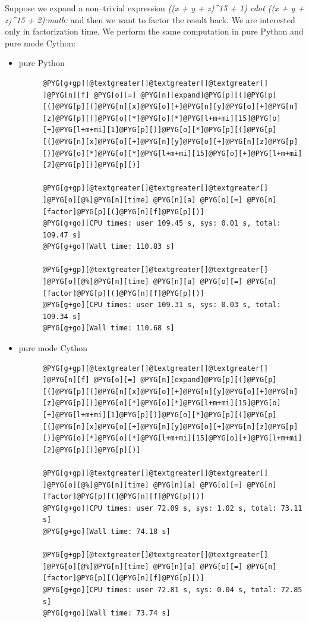 Suppose we expand a non--trivial expression \emph{((x + y + z)\textasciicircum{}15 + 1) cdot ((x + y + z)\textasciicircum{}15 + 2):math:} and
then we want to factor the result back. We are interested only in factorization time. We perform
the same computation in pure Python and pure mode Cython:
\begin{itemize}
\item {} \begin{description}
\item[pure Python] \leavevmode
\begin{Verbatim}[commandchars=@\[\]]
@PYG[g+gp][@textgreater[]@textgreater[]@textgreater[] ]@PYG[n][f] @PYG[o][=] @PYG[n][expand]@PYG[p][(]@PYG[p][(]@PYG[p][(]@PYG[n][x]@PYG[o][+]@PYG[n][y]@PYG[o][+]@PYG[n][z]@PYG[p][)]@PYG[o][*]@PYG[o][*]@PYG[l+m+mi][15]@PYG[o][+]@PYG[l+m+mi][1]@PYG[p][)]@PYG[o][*]@PYG[p][(]@PYG[p][(]@PYG[n][x]@PYG[o][+]@PYG[n][y]@PYG[o][+]@PYG[n][z]@PYG[p][)]@PYG[o][*]@PYG[o][*]@PYG[l+m+mi][15]@PYG[o][+]@PYG[l+m+mi][2]@PYG[p][)]@PYG[p][)]

@PYG[g+gp][@textgreater[]@textgreater[]@textgreater[] ]@PYG[o][@%]@PYG[n][time] @PYG[n][a] @PYG[o][=] @PYG[n][factor]@PYG[p][(]@PYG[n][f]@PYG[p][)]
@PYG[g+go][CPU times: user 109.45 s, sys: 0.01 s, total: 109.47 s]
@PYG[g+go][Wall time: 110.83 s]

@PYG[g+gp][@textgreater[]@textgreater[]@textgreater[] ]@PYG[o][@%]@PYG[n][time] @PYG[n][a] @PYG[o][=] @PYG[n][factor]@PYG[p][(]@PYG[n][f]@PYG[p][)]
@PYG[g+go][CPU times: user 109.31 s, sys: 0.03 s, total: 109.34 s]
@PYG[g+go][Wall time: 110.68 s]
\end{Verbatim}
\noindent
\end{description}

\item {} \begin{description}
\item[pure mode Cython] \leavevmode
\begin{Verbatim}[commandchars=@\[\]]
@PYG[g+gp][@textgreater[]@textgreater[]@textgreater[] ]@PYG[n][f] @PYG[o][=] @PYG[n][expand]@PYG[p][(]@PYG[p][(]@PYG[p][(]@PYG[n][x]@PYG[o][+]@PYG[n][y]@PYG[o][+]@PYG[n][z]@PYG[p][)]@PYG[o][*]@PYG[o][*]@PYG[l+m+mi][15]@PYG[o][+]@PYG[l+m+mi][1]@PYG[p][)]@PYG[o][*]@PYG[p][(]@PYG[p][(]@PYG[n][x]@PYG[o][+]@PYG[n][y]@PYG[o][+]@PYG[n][z]@PYG[p][)]@PYG[o][*]@PYG[o][*]@PYG[l+m+mi][15]@PYG[o][+]@PYG[l+m+mi][2]@PYG[p][)]@PYG[p][)]

@PYG[g+gp][@textgreater[]@textgreater[]@textgreater[] ]@PYG[o][@%]@PYG[n][time] @PYG[n][a] @PYG[o][=] @PYG[n][factor]@PYG[p][(]@PYG[n][f]@PYG[p][)]
@PYG[g+go][CPU times: user 72.09 s, sys: 1.02 s, total: 73.11 s]
@PYG[g+go][Wall time: 74.18 s]

@PYG[g+gp][@textgreater[]@textgreater[]@textgreater[] ]@PYG[o][@%]@PYG[n][time] @PYG[n][a] @PYG[o][=] @PYG[n][factor]@PYG[p][(]@PYG[n][f]@PYG[p][)]
@PYG[g+go][CPU times: user 72.81 s, sys: 0.04 s, total: 72.85 s]
@PYG[g+go][Wall time: 73.74 s]
\end{Verbatim}
\noindent
\end{description}

\end{itemize}

